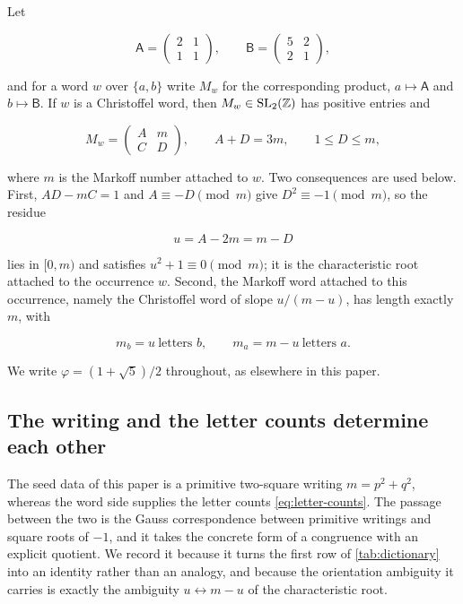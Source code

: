 Let

\begin{equation}
 \mathsf A=\begin{pmatrix}2&1\\1&1\end{pmatrix},
 \qquad
 \mathsf B=\begin{pmatrix}5&2\\2&1\end{pmatrix},
 \label{eq:cohn-generators}
\end{equation}

and for a word $w$ over $\{a,b\}$ write $M_w$ for the corresponding product,
$a\mapsto\mathsf A$ and $b\mapsto\mathsf B$. If $w$ is a Christoffel word,
then $M_w\in\mathrm{SL}_2(\mathbb{Z})$ has positive entries and

\begin{equation}
 M_w=\begin{pmatrix}A&m\\C&D\end{pmatrix},
 \qquad
 A+D=3m,
 \qquad
 1\leqslant D\leqslant m,
 \label{eq:cohn-normalization}
\end{equation}

where $m$ is the Markoff number attached to $w$. Two consequences are used
below. First, $AD-mC=1$ and $A\equiv-D\pmod m$ give $D^2\equiv-1\pmod m$, so
the residue

\begin{equation}
 u=A-2m=m-D
 \label{eq:characteristic-root}
\end{equation}

lies in $[0,m)$ and satisfies $u^2+1\equiv0\pmod m$; it is the
characteristic root attached to the occurrence $w$. Second, the Markoff word
attached to this occurrence, namely the Christoffel word of slope
$u/(m-u)$, has length exactly $m$, with

\begin{equation}
 m_b=u\ \text{letters }b,
 \qquad
 m_a=m-u\ \text{letters }a.
 \label{eq:letter-counts}
\end{equation}

We write $\varphi=(1+\sqrt5)/2$ throughout, as elsewhere in this paper.

\subsection{The writing and the letter counts determine each other}

The seed data of this paper is a primitive two-square writing $m=p^2+q^2$,
whereas the word side supplies the letter counts \cref{eq:letter-counts}. The
passage between the two is the Gauss correspondence between primitive writings
and square roots of $-1$, and it takes the concrete form of a congruence with
an explicit quotient. We record it because it turns the first row of
\cref{tab:dictionary} into an identity rather than an analogy, and because the
orientation ambiguity it carries is exactly the ambiguity
$u\leftrightarrow m-u$ of the characteristic root.

